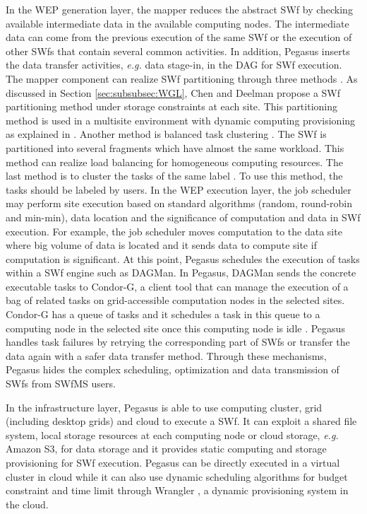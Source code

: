 In the WEP generation layer, the mapper reduces the abstract SWf by checking available intermediate data in the available computing nodes. The intermediate data can come from the previous execution of the same 
SWf or the execution of other SWfs that contain several common activities. 
In addition, Pegasus inserts the data transfer activities, \textit{e.g.} data stage-in, in the DAG for SWf execution. 
The mapper component can realize SWf partitioning through three methods
\cite{Chen2012a,Chen2013,Deelman2014}. As discussed in Section \ref{sec:subsubsec:WGL}, Chen and Deelman \cite{Chen2012a} propose a SWf partitioning method under storage constraints at each site. This partitioning method is used in a multisite environment with dynamic computing provisioning as explained in \cite{Chen2012}.
Another method is balanced task clustering \cite{Chen2013}.
The SWf is partitioned into several fragments which have almost the same workload. This method can realize load balancing for homogeneous computing resources. 
The last method is to cluster the tasks of the same label \cite{Deelman2014}.
To use this method, the tasks should be labeled by users.
In the WEP execution layer, the job scheduler may perform site execution based on standard algorithms (random, round-robin and min-min),
data location and the significance of computation and data in SWf execution. For example, the job scheduler moves computation to the data site where big volume of data is located and it sends data to compute site if computation is significant. 
At this point, Pegasus schedules the execution of tasks within a SWf engine such as DAGMan.  
In Pegasus, DAGMan sends the concrete executable tasks to Condor-G, a client tool
that can manage the execution of a bag of related tasks on grid-accessible computation nodes in the selected sites. 
Condor-G has a queue of tasks and it schedules a task in this queue to a computing node in the selected site once this computing node is idle \cite{Frey2001,Litzkow1988}. 
Pegasus handles task failures by retrying the corresponding part of SWfs or transfer the data again with a safer data transfer method. 
Through these mechanisms, Pegasus hides the complex scheduling, optimization and data transmission of SWfs from SWfMS users.

In the infrastructure layer, Pegasus is able to use computing cluster, grid (including desktop grids) and cloud to execute a SWf. 
It can exploit a shared file system, local storage resources at each computing node or cloud storage, \textit{e.g.} Amazon S$3$, for data storage and it provides static computing and storage provisioning for SWf execution. Pegasus can be directly executed in a virtual cluster in cloud \cite{Juve2011} while it can also use dynamic scheduling algorithms \cite{Malawski2012,Nagavaram2011} for budget constraint and time limit through Wrangler \cite{Juve2011a}, a dynamic provisioning system in the cloud.

